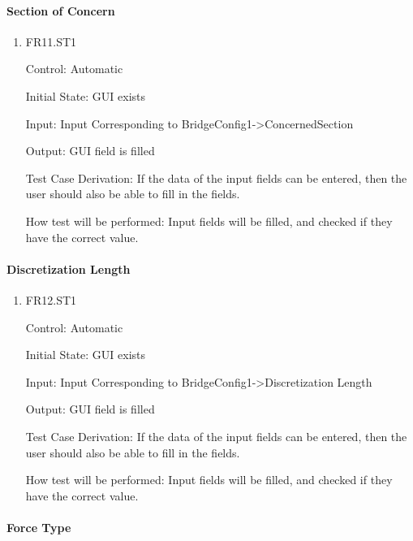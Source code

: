 \documentclass[12pt, titlepage]{article}
\begin{document}
\paragraph{Section of Concern}

\begin{enumerate}

  \item{FR11.ST1\\}

  Control: Automatic
            
  Initial State: GUI exists
            
  Input: Input Corresponding to BridgeConfig1->ConcernedSection
            
  Output: GUI field is filled

  Test Case Derivation: If the data of the input fields can be entered, then the user should also be able to fill in the fields.

  How test will be performed: Input fields will be filled, and checked if they have the correct value. 
					
\end{enumerate}

\paragraph{Discretization Length}

\begin{enumerate}

  \item{FR12.ST1\\}

Control: Automatic
					
Initial State: GUI exists
					
Input: Input Corresponding to BridgeConfig1->Discretization Length
					
Output: GUI field is filled

Test Case Derivation: If the data of the input fields can be entered, then the user should also be able to fill in the fields.

How test will be performed: Input fields will be filled, and checked if they have the correct value. 

\end{enumerate}

\paragraph{Force Type}
\end{document}
